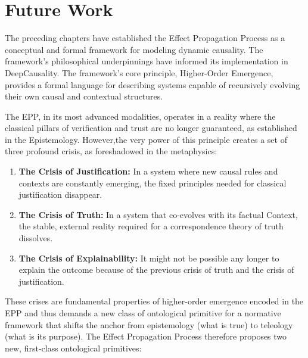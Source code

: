 \section{Future Work}
\label{sec:future_work}


The preceding chapters have established the Effect Propagation Process as a conceptual and formal framework for modeling dynamic causality.
The framework's philosophical underpinnings have informed its implementation in DeepCausality. The framework's core principle,
Higher-Order Emergence, provides a formal language for describing systems capable of recursively evolving their own causal and contextual structures.

The EPP, in its most advanced modalities, operates in a reality where the classical pillars of verification and trust are no longer guaranteed,
as established in the Epistemology. However,the very power of this principle creates a set of three profound crisis,
as foreshadowed in the metaphysics:

\begin{enumerate}
    \item \textbf{The Crisis of Justification:} In a system where new causal rules and contexts are constantly emerging, the fixed principles needed for classical justification disappear.
    \item \textbf{The Crisis of Truth:} In a system that co-evolves with its factual Context, the stable, external reality required for a correspondence theory of truth dissolves.
    \item \textbf{The Crisis of Explainability:} It might not be possible any longer to explain the outcome because of the previous crisis of truth and the crisis of justification.
\end{enumerate}


These crises are fundamental properties of higher-order emergence encoded in the EPP and thus demands a new class of ontological primitive for a normative framework that shifts the anchor from epistemology (what is true) to teleology (what is its purpose).
The Effect Propagation Process therefore proposes two new, first-class ontological primitives:

